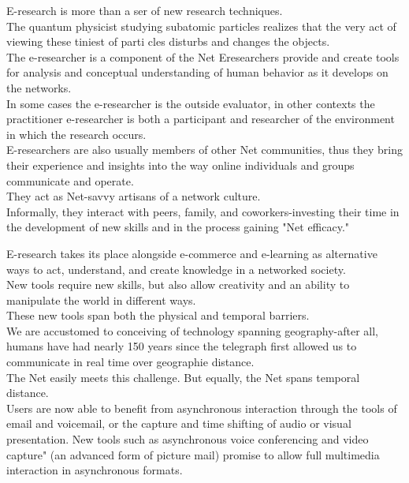 \documentclass{beamer}
\begin{document}
\begin{frame}
E-research is more than a ser of new research techniques. \\
The quantum physicist
studying subatomic particles realizes that the very act of viewing these tiniest of parti cles
disturbs and changes the objects. \\
The e-researcher is a component of the Net Eresearchers
provide and create tools for analysis and conceptual understanding of human behavior as
it develops on the networks.\\
 In some cases the e-researcher is the outside evaluator, in
other contexts the practitioner e-researcher is both a participant and researcher of the
environment in which the research occurs. \\
E-researchers are also usually members of
other Net communities, thus they bring their experience and insights into the way online
individuals and groups communicate and operate.\\
 They act as Net-savvy artisans of a network culture. \\
 Informally, they interact with peers, family, and coworkers-investing their
time in the development of new skills and in the process gaining "Net efficacy."
  \end{frame}
  
\begin{frame}
E-research takes its place alongside e-commerce and e-learning as alternative ways to
act, understand, and create knowledge in a networked society.\\
 New tools require new
skills, but also allow creativity and an ability to manipulate the world in different ways.\\
These new tools span both the physical and temporal barriers.\\
 We are accustomed to
conceiving of technology spanning geography-after all, humans have had nearly 150 years
since the telegraph first allowed us to communicate in real time over geographie distance.\\
The Net easily meets this challenge. But equally, the Net spans temporal distance. \\
Users
are now able to benefit from asynchronous interaction through the tools of email and
voicemail, or the capture and time shifting of audio or visual presentation. New tools such
as asynchronous voice conferencing and video capture" (an advanced form of picture mail)
promise to allow full multimedia interaction in asynchronous formats.
 \end{frame}
\end{document}
